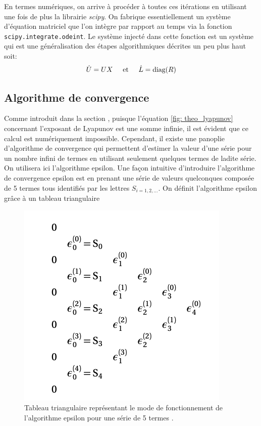     En termes numériques, on arrive à procéder à toutes ces itérations en utilisant une fois de plus la librairie \textit{scipy}. On fabrique essentiellement un système d'équation matriciel que l'on intègre par rapport au temps via la fonction \texttt{scipy.integrate.odeint}. Le système injecté dans cette fonction est un système qui est une généralisation des étapes algorithmiques décrites un peu plus haut soit:
    \begin{align*}
        \Dot{U} = UX\hspace{0.5cm}\text{et}\hspace{0.5cm}\Dot{L} = \text{diag}(R)
    \end{align*}

\subsection{Algorithme de convergence} \label{subsec: convergence}
    Comme introduit dans la section , puisque l'équation \eqref{fig: theo_lyapunov} concernant l'exposant de Lyapunov est une somme infinie, il est évident que ce calcul est numériquement impossible. Cependant, il existe une panoplie d'algorithme de convergence qui permettent d'estimer la valeur d'une série pour un nombre infini de termes en utilisant seulement quelques termes de ladite série. On utilisera ici l'algorithme epsilon. Une façon intuitive d'introduire l'algorithme de convergence epsilon est en prenant une série de valeurs quelconques composée de 5 termes tous identifiés par les lettres $S_{i=1, 2,\dots}$. On définit l'algorithme epsilon grâce à un tableau triangulaire
    \begin{figure}[h!]
        \centering
        \includegraphics[scale=0.3]{figs/epsilon_tri_array.png}
        \caption{Tableau triangulaire représentant le mode de fonctionnement de l'algorithme epsilon pour une série de 5 termes \cite{SENECH}.}
        \label{fig: epsilon_tri_array}
    \end{figure}
